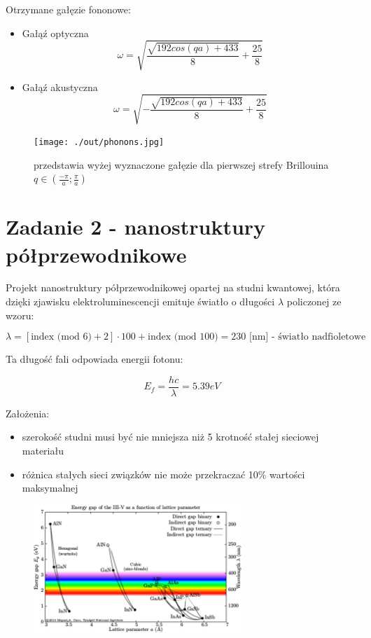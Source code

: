 \documentclass{article}
\begin{document}
Otrzymane gałęzie fononowe:

\begin{itemize}
	\item Gałąź optyczna
		$$ \omega = \sqrt{ \frac{\sqrt{192 cos(qa) + 433}}{8} + \frac{25}{8} } $$
	\item Gałąź akustyczna
		$$ \omega = \sqrt{ - \frac{\sqrt{192 cos(qa) + 433}}{8} + \frac{25}{8} } $$
\end{itemize}

\renewcommand{\figurename}{Wykres}
\begin{figure}[ht!]
    \centering
    \texttt{[image: ./out/phonons.jpg]}
    \caption{przedstawia wyżej wyznaczone gałęzie dla pierwszej strefy Brillouina $q\in(\frac{-\pi}{a};\frac{\pi}{a})$}
    \centering
\end{figure}



\section*{Zadanie 2 - nanostruktury półprzewodnikowe}
Projekt nanostruktury półprzewodnikowej opartej na studni kwantowej, która dzięki zjawisku elektroluminescencji emituje światło o długości $\lambda$ policzonej ze wzoru:

$$ \lambda = [\mbox{index (mod 6)} + 2] \cdot 100 + \mbox{index (mod 100)} = 230\mbox{ [nm] - światło nadfioletowe}$$

Ta długość fali odpowiada energii fotonu:

$$E_f = \frac{hc}{\lambda} = 5.39 eV$$

Założenia:
\begin{itemize}
	\item szerokość studni musi być nie mniejsza niż 5 krotność stałej sieciowej materiału
	\item różnica stałych sieci związków nie może przekraczać 10\% wartości maksymalnej
\end{itemize}

\begin{figure}[ht!]
    \centering
    \includegraphics[width=0.7\textwidth]{./misc/polprzewodniki1.png}
    \centering
\end{figure}
\end{document}
